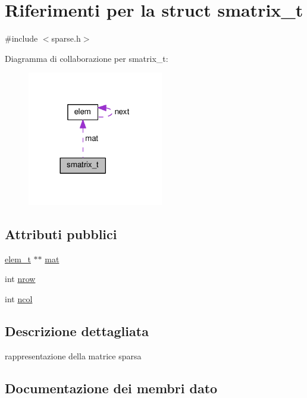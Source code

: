 \hypertarget{structsmatrix__t}{}\section{Riferimenti per la struct smatrix\+\_\+t}
\label{structsmatrix__t}


{\ttfamily \#include $<$sparse.\+h$>$}



Diagramma di collaborazione per smatrix\+\_\+t\+:\nopagebreak
\begin{figure}[H]
\begin{center}
\leavevmode
\includegraphics[width=168pt]{structsmatrix__t__coll__graph}
\end{center}
\end{figure}
\subsection*{Attributi pubblici}
\begin{DoxyCompactItemize}
\item 
\hyperlink{sparse_8h_a14aec81bdea9c2d34b666b7157117387}{elem\+\_\+t} $\ast$$\ast$ \hyperlink{structsmatrix__t_aa60ccb45be474ec81f6daab4fcdab2c4}{mat}
\item 
int \hyperlink{structsmatrix__t_ae0b8f31ddab7ed23ca14a46758291f37}{nrow}
\item 
int \hyperlink{structsmatrix__t_a7a7218430298fc18a42dfa43ecc41635}{ncol}
\end{DoxyCompactItemize}


\subsection{Descrizione dettagliata}
rappresentazione della matrice sparsa 

\subsection{Documentazione dei membri dato}
